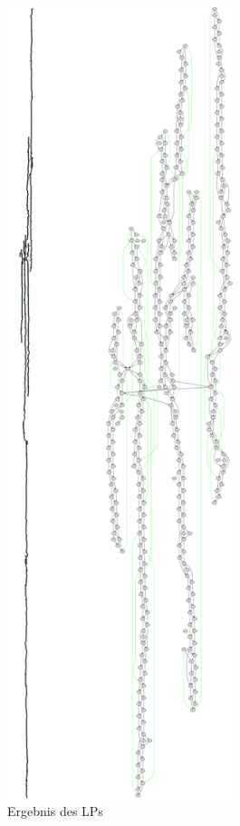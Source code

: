 \begin{figure}
	\begin{center}
		\includegraphics[width=6.6cm]{bilder/vergrossert}
	\end{center}
	\caption{Ergebnis des LPs}
	\label{ersterdurchlauf}
\end{figure}

